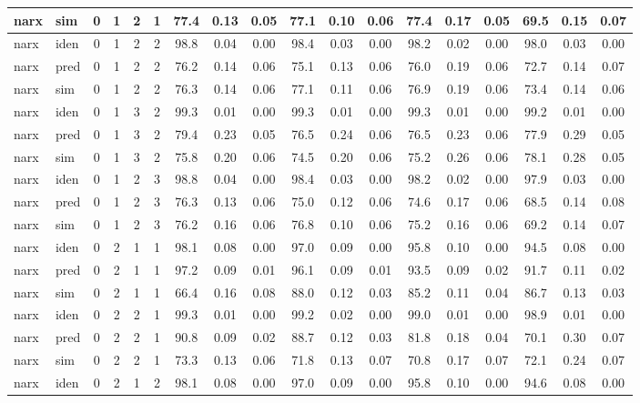 \begin{landscape}
\begin{center}
\begin{longtable}{ll|cccc|ccc|ccc|ccc|ccc}
narx & sim  & 0 & 1 & 2 & 1 & 77.4 & 0.13 & 0.05 & 77.1 & 0.10 & 0.06 & 77.4 & 0.17 & 0.05 & 69.5 & 0.15 & 0.07 \\ 
 \hline 
narx & iden & 0 & 1 & 2 & 2 & 98.8 & 0.04 & 0.00 & 98.4 & 0.03 & 0.00 & 98.2 & 0.02 & 0.00 & 98.0 & 0.03 & 0.00 \\ 
narx & pred & 0 & 1 & 2 & 2 & 76.2 & 0.14 & 0.06 & 75.1 & 0.13 & 0.06 & 76.0 & 0.19 & 0.06 & 72.7 & 0.14 & 0.07 \\ 
narx & sim  & 0 & 1 & 2 & 2 & 76.3 & 0.14 & 0.06 & 77.1 & 0.11 & 0.06 & 76.9 & 0.19 & 0.06 & 73.4 & 0.14 & 0.06 \\ 
 \hline 
narx & iden & 0 & 1 & 3 & 2 & 99.3 & 0.01 & 0.00 & 99.3 & 0.01 & 0.00 & 99.3 & 0.01 & 0.00 & 99.2 & 0.01 & 0.00 \\ 
narx & pred & 0 & 1 & 3 & 2 & 79.4 & 0.23 & 0.05 & 76.5 & 0.24 & 0.06 & 76.5 & 0.23 & 0.06 & 77.9 & 0.29 & 0.05 \\ 
narx & sim  & 0 & 1 & 3 & 2 & 75.8 & 0.20 & 0.06 & 74.5 & 0.20 & 0.06 & 75.2 & 0.26 & 0.06 & 78.1 & 0.28 & 0.05 \\ 
 \hline 
narx & iden & 0 & 1 & 2 & 3 & 98.8 & 0.04 & 0.00 & 98.4 & 0.03 & 0.00 & 98.2 & 0.02 & 0.00 & 97.9 & 0.03 & 0.00 \\ 
narx & pred & 0 & 1 & 2 & 3 & 76.3 & 0.13 & 0.06 & 75.0 & 0.12 & 0.06 & 74.6 & 0.17 & 0.06 & 68.5 & 0.14 & 0.08 \\ 
narx & sim  & 0 & 1 & 2 & 3 & 76.2 & 0.16 & 0.06 & 76.8 & 0.10 & 0.06 & 75.2 & 0.16 & 0.06 & 69.2 & 0.14 & 0.07 \\ 
 \hline 
narx & iden & 0 & 2 & 1 & 1 & 98.1 & 0.08 & 0.00 & 97.0 & 0.09 & 0.00 & 95.8 & 0.10 & 0.00 & 94.5 & 0.08 & 0.00 \\ 
narx & pred & 0 & 2 & 1 & 1 & 97.2 & 0.09 & 0.01 & 96.1 & 0.09 & 0.01 & 93.5 & 0.09 & 0.02 & 91.7 & 0.11 & 0.02 \\ 
narx & sim  & 0 & 2 & 1 & 1 & 66.4 & 0.16 & 0.08 & 88.0 & 0.12 & 0.03 & 85.2 & 0.11 & 0.04 & 86.7 & 0.13 & 0.03 \\ 
 \hline 
narx & iden & 0 & 2 & 2 & 1 & 99.3 & 0.01 & 0.00 & 99.2 & 0.02 & 0.00 & 99.0 & 0.01 & 0.00 & 98.9 & 0.01 & 0.00 \\ 
narx & pred & 0 & 2 & 2 & 1 & 90.8 & 0.09 & 0.02 & 88.7 & 0.12 & 0.03 & 81.8 & 0.18 & 0.04 & 70.1 & 0.30 & 0.07 \\ 
narx & sim  & 0 & 2 & 2 & 1 & 73.3 & 0.13 & 0.06 & 71.8 & 0.13 & 0.07 & 70.8 & 0.17 & 0.07 & 72.1 & 0.24 & 0.07 \\ 
 \hline 
narx & iden & 0 & 2 & 1 & 2 & 98.1 & 0.08 & 0.00 & 97.0 & 0.09 & 0.00 & 95.8 & 0.10 & 0.00 & 94.6 & 0.08 & 0.00 \\ 

\end{longtable}
\end{center}
\end{landscape}
